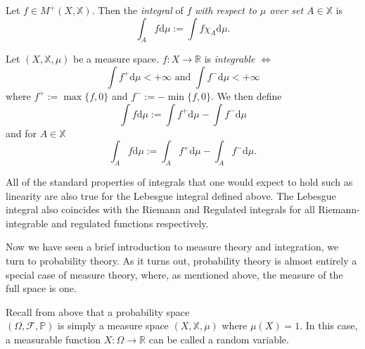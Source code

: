 \begin{definition}
    Let $f\in M^+(X,\mathbb{X})$. Then the \emph{integral} of $f$
    \emph{with respect to $\mu$ over set $A\in \mathbb{X}$} is
    \begin{equation*}
        \int_A f\mathrm d\mu:=\int f\chi_A\mathrm d\mu.
    \end{equation*}
\end{definition}

\begin{definition}
    Let $(X,\mathbb{X},\mu)$ be a measure space. $f:X\rightarrow\mathbb{R}$
    is \emph{integrable} $\iff$
    \begin{equation*}
        \int f^+\mathrm d\mu<+\infty \textrm{ and }\int f^-\mathrm d\mu<+\infty
    \end{equation*}
    where $f^+:=\max\{f,0\}$ and $f^-:=-\min\{f,0\}$.
    We then define
    \begin{equation*}
        \int f\mathrm d\mu:=\int f^+\mathrm d\mu -\int f^-\mathrm d\mu
    \end{equation*}
    and for $A\in\mathbb{X}$
    \begin{equation*}
        \int_A f\mathrm d\mu:=\int_A f^+\mathrm d\mu -\int_A f^-\mathrm d\mu.
    \end{equation*}
\end{definition}

\begin{remark}
    All of the standard properties of integrals that one would expect
    to hold such as linearity are also true for the Lebesgue integral 
    defined above. The Lebesgue integral also coincides with the Riemann
    and Regulated integrals for all Riemann-integrable and regulated functions respectively.
\end{remark}

Now we have seen a brief introduction to measure theory and integration, we turn to 
probability theory. As it turns out, probability theory is almost entirely a special
case of measure theory, where, as mentioned above, the measure of the full space is one.

\begin{definition}
    Recall from above that a probability space \\$(\Omega,\mathcal{F},\mathbb{P})$
    is simply a measure space $(X,\mathbb{X},\mu)$ where $\mu(X)=1.$ In this case,
    a measurable function $X:\Omega\rightarrow\mathbb{R}$ can be called
    a random variable. 
\end{definition}

